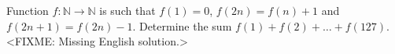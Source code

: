 \problem
Function $f: \mathbb{N} \to \mathbb{N}$ is such that
$f(1) = 0$, $f(2 n) = f(n) + 1$ and $f(2 n + 1) = f(2 n) - 1$.
Determine the sum $f(1) + f(2) + \ldots + f(127)$.
\solution
<FIXME: Missing English solution.>
\endproblem
